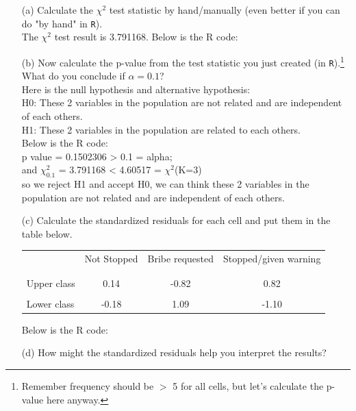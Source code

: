 \documentclass[12pt,letterpaper]{article}
\begin{document}
\begin{enumerate}
	
	\item [(a)]
	Calculate the $\chi^2$ test statistic by hand/manually (even better if you can do "by hand" in \texttt{R}).\\
	
	The $\chi^2$ test result is 3.791168. Below is the R code: 
	
	\newpage
	\item [(b)]
	Now calculate the p-value from the test statistic you just created (in \texttt{R}).\footnote{Remember frequency should be $>$ 5 for all cells, but let's calculate the p-value here anyway.}  What do you conclude if $\alpha = 0.1$?\\
	
	Here is the null hypothesis and alternative hypothesis: \\
	H0:  These 2 variables in the population are not related and are independent of each others. \\
	H1: These 2 variables in the population are related to each others. \\
	Below is the R code: \\
	
	p value = 0.1502306 > 0.1 = alpha; \\
	and $\chi^2_{0.1}$ = 3.791168 < 4.60517 = $\chi^2$(K=3) \\
	
	so we reject H1 and accept H0, we can think these 2 variables in the population are not related and are independent of each others.
	\newpage
	\item [(c)] Calculate the standardized residuals for each cell and put them in the table below.
	\vspace{1cm}
	
	\begin{table}[h]
		\centering
		\begin{tabular}{l | c c c }
			& Not Stopped & Bribe requested & Stopped/given warning \\
			\\[-1.8ex] 
			\hline \\[-1.8ex]
			Upper class  &0.14  &-0.82  &0.82  \\
			\\
			Lower class &-0.18  &1.09   &-1.10  \\

		\end{tabular}
	\end{table}
	Below is the R code:
	
	\newpage
	\item [(d)] How might the standardized residuals help you interpret the results?  \\
	

\end{enumerate}
\end{document}
